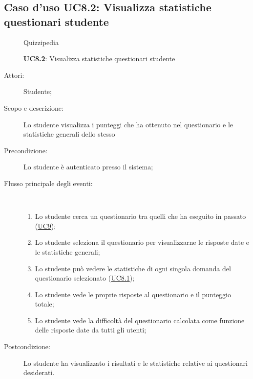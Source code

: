 \subsection{Caso d'uso UC8.2: Visualizza statistiche questionari studente}
	\begin{figure}[H]
		\centering
		\begin{resizedtikzpicture}{\textwidth}
		\begin{umlsystem}[x=0, fill=lightgray!20]{Quizzipedia}
		\end{umlsystem}
		\end{resizedtikzpicture}
		\caption{\textbf{UC8.2}: Visualizza statistiche questionari studente}
		\label{UC8.2}
	\end{figure}
\begin{description}
\item[Attori:] Studente;
\item[Scopo e descrizione:] Lo studente visualizza i punteggi che ha ottenuto nel questionario e le statistiche generali dello stesso
      \item[Precondizione:] Lo studente è autenticato presso il sistema;

        \item[Flusso principale degli eventi:] \ 
 \begin{enumerate}
          \item Lo studente cerca un questionario tra quelli che ha eseguito in passato (\hyperlink{UC9}{UC9});
          \item Lo studente seleziona il questionario per visualizzarne le risposte date e le statistiche generali;
          \item Lo studente può vedere le statistiche di ogni singola domanda del questionario selezionato (\hyperlink{UC8.1}{UC8.1});
          \item Lo studente vede le proprie risposte al questionario e il punteggio totale;
          \item Lo studente vede la difficoltà del questionario calcolata come funzione delle risposte date da tutti gli utenti;

      \end{enumerate}
    \item[Postcondizione:] Lo studente ha visualizzato i risultati e le statistiche relative ai questionari desiderati.
  \end{description}
\hypertarget{UC8.3}{}
